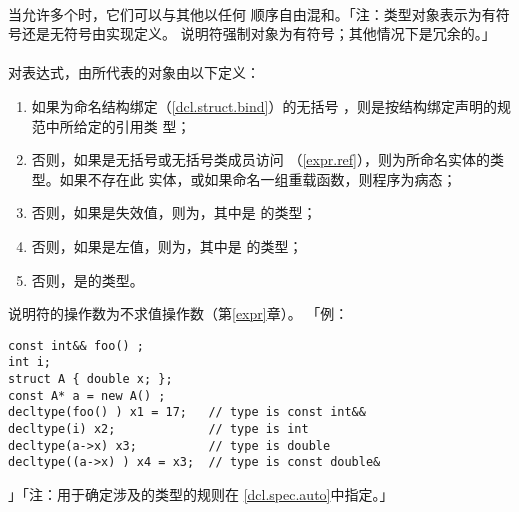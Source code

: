 \paragraph{}
当允许多个时，它们可以与其他以任何
顺序自由混和。「注：类型对象表示为有符号还是无符号由实现定义。
说明符强制对象为有符号；其他情况下是冗余的。」

\paragraph{}
对表达式，由所代表的对象由以下定义：
\begin{enumerate}
  \item{如果为命名结构绑定（\ref{dcl.struct.bind}）的无括号
    ，则是按结构绑定声明的规范中所给定的引用类
    型；}
  \item{否则，如果是无括号或无括号类成员访问
    （\ref{expr.ref}），则为所命名实体的类型。如果不存在此
    实体，或如果命名一组重载函数，则程序为病态；}
  \item{否则，如果是失效值，则为，其中是
    的类型；}
  \item{否则，如果是左值，则为，其中是
    的类型；}
  \item{否则，是的类型。}
\end{enumerate}
说明符的操作数为不求值操作数（第\ref{expr}章）。
「例：
\begin{lstlisting}
const int&& foo() ;
int i;
struct A { double x; };
const A* a = new A() ;
decltype(foo() ) x1 = 17;   // type is const int&&
decltype(i) x2;             // type is int
decltype(a->x) x3;          // type is double
decltype((a->x) ) x4 = x3;  // type is const double&
\end{lstlisting}」「注：用于确定涉及的类型的规则在
\ref{dcl.spec.auto}中指定。」

